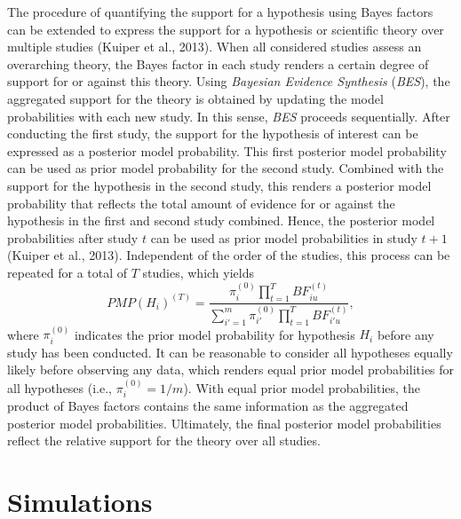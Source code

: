\documentclass[
]{interact}
\begin{document}
The procedure of quantifying the support for a hypothesis using Bayes
factors can be extended to express the support for a hypothesis or
scientific theory over multiple studies (Kuiper et al., 2013). When all
considered studies assess an overarching theory, the Bayes factor in
each study renders a certain degree of support for or against this
theory. Using \emph{Bayesian Evidence Synthesis} (\emph{BES}), the
aggregated support for the theory is obtained by updating the model
probabilities with each new study. In this sense, \emph{BES} proceeds
sequentially. After conducting the first study, the support for the
hypothesis of interest can be expressed as a posterior model
probability. This first posterior model probability can be used as prior
model probability for the second study. Combined with the support for
the hypothesis in the second study, this renders a posterior model
probability that reflects the total amount of evidence for or against
the hypothesis in the first and second study combined. Hence, the
posterior model probabilities after study \(t\) can be used as prior
model probabilities in study \(t + 1\) (Kuiper et al., 2013).
Independent of the order of the studies, this process can be repeated
for a total of \(T\) studies, which yields \[
PMP(H_i)^{(T)} = \frac{
  \pi^{(0)}_{i} \prod^T_{t=1} BF^{(t)}_{iu}
}{
  \sum^m_{i'=1} \pi^{(0)}_{i'} \prod^T_{t=1} BF^{(t)}_{i'u}
},
\] where \(\pi^{(0)}_i\) indicates the prior model probability for
hypothesis \(H_i\) before any study has been conducted. It can be
reasonable to consider all hypotheses equally likely before observing
any data, which renders equal prior model probabilities for all
hypotheses (i.e., \(\pi^{(0)}_i = 1/m\)). With equal prior model
probabilities, the product of Bayes factors contains the same
information as the aggregated posterior model probabilities. Ultimately,
the final posterior model probabilities reflect the relative support for
the theory over all studies.

\hypertarget{simulations}{%
\section{Simulations}\label{simulations}}
\end{document}
